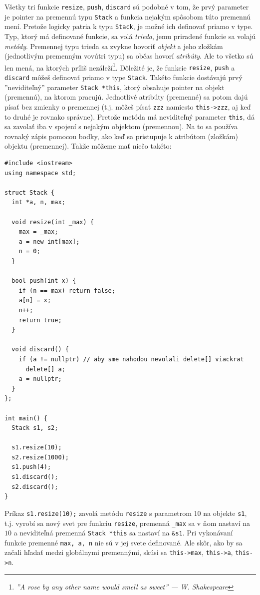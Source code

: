 \documentclass[10pt]{article}
\def\prg{\lstinline}
\def\ods{\vspace*{10pt}}
\begin{document}
\ods
Všetky tri funkcie {\tt resize}, {\tt push}, {\tt discard} sú podobné v tom, že prvý
parameter je pointer na premennú typu {\tt Stack} a funkcia nejakým spôsobom túto premennú 
mení. Pretože logicky patria k typu {\tt Stack}, je možné ich definovať priamo v type.
Typ, ktorý má definované funkcie, sa volá {\em trieda}, jemu priradené funkcie sa volajú
{\em metódy}. Premennej typu trieda sa zvykne hovoriť {\em objekt} a jeho zložkám 
(jednotlivým premenným vovútri typu) sa občas hovorí {\em atribúty}. Ale to všetko sú
len mená, na ktorých príliš nezáleží\footnote{{\em ''A rose by any other name would 
smell as sweet'' --- W. Shakespeare}}. Dôležité je, že funkcie {\tt resize}, {\tt push}
a {\tt discard} môžeš definovať priamo v type {\tt Stack}. Takéto funkcie
dostávajú prvý ''neviditeľný'' parameter \prg!Stack *this!, ktorý obsahuje pointer
na objekt (premennú), na ktorom pracujú. Jednotlivé atribúty (premenné) sa potom
dajú písať bez zmienky o premennej (t.j. môžeš písať {\tt zzz} namiesto \prg!this->zzz!, 
aj keď to druhé je rovnako správne). Pretože metóda má neviditeľný parameter \prg!this!,
dá sa zavolať iba v spojení s nejakým objektom (premennou).  Na to sa používa rovnaký zápis
pomocou bodky, ako keď sa pristupuje k atribútom (zložkám) objektu (premennej). 
Takže môžeme mať niečo takéto:

\begin{lstlisting}[] 
#include <iostream>
using namespace std;

struct Stack {
  int *a, n, max;

  void resize(int _max) {
    max = _max;
    a = new int[max];
    n = 0;
  }

  bool push(int x) {
    if (n == max) return false;
    a[n] = x;
    n++;
    return true;
  }

  void discard() {
    if (a != nullptr) // aby sme nahodou nevolali delete[] viackrat
      delete[] a;
    a = nullptr;
  }
};

int main() {
  Stack s1, s2;

  s1.resize(10);
  s2.resize(1000);
  s1.push(4);
  s1.discard();
  s2.discard();
}
\end{lstlisting}

Príkaz \prg!s1.resize(10);! zavolá metódu {\tt resize} s parametrom 10 na objekte {\tt s1},
t.j. vyrobí sa nový svet pre funkciu {\tt resize}, 
premenná {\tt \_max} sa v ňom nastaví na $10$ a 
neviditeľná premenná \prg!Stack *this! sa nastaví na \prg!&s1!. Pri vykonávaní funkcie
premenné \prg!max, a, n! nie sú v jej svete definované.  Ale skôr, ako by sa 
začali hľadať medzi globálnymi premennými, skúsi sa
\prg!this->max!, \prg!this->a!, \prg!this->n!. 
\end{document}
